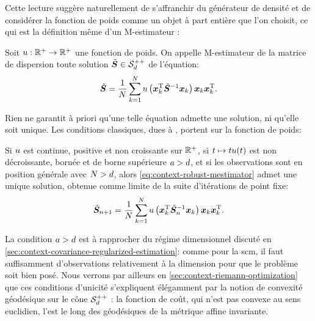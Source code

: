 Cette lecture suggère naturellement de s'affranchir du générateur de densité et de considérer la fonction de poids comme un objet à part entière que l'on choisit, ce qui est la définition même d'un M-estimateur :

\begin{definition}
\label{def:context-robust-mestimator}
  Soit $u:\mathbb{R}^+\to\mathbb{R}^+$ une fonction de poids. On appelle M-estimateur de la matrice de dispersion toute solution $\tilde{\boldsymbol{S}}\in\mathcal{S}_{d}^{++}$ de l'équation:
\begin{equation}
  \tilde{\boldsymbol{S}}
  =
  \frac{1}{N}\sum_{k=1}^{N}
  u\left(\boldsymbol{x}_k^{\mathrm{T}} {\tilde{\boldsymbol{S}}}^{-1} \boldsymbol{x}_k\right)
  \boldsymbol{x}_k\boldsymbol{x}_k^{\mathrm{T}}.
  \label{eq:context-robust-mestimator}
\end{equation}
\end{definition}

Rien ne garantit à priori qu'une telle équation admette une solution, ni qu'elle soit unique. Les conditions classiques, dues à \cite{Maronna76}, portent sur la fonction de poids:

\begin{proposition}
\label{prop:context-robust-existence}
  Si $u$ est continue, positive et non croissante sur $\mathbb{R}^+$, si $t\mapsto tu(t)$ est non décroissante, bornée et de borne supérieure $a>d$, et si les observations sont en position générale avec $N>d$, alors \cref{eq:context-robust-mestimator} admet une unique solution, obtenue comme limite de la suite d'itérations de point fixe:
\begin{equation}
  \tilde{\boldsymbol{S}}_{n+1}
  =
  \frac{1}{N}\sum_{k=1}^{N}
  u\left(\boldsymbol{x}_k^{\mathrm{T}} {\tilde{\boldsymbol{S}}_n}^{-1} \boldsymbol{x}_k\right)
  \boldsymbol{x}_k\boldsymbol{x}_k^{\mathrm{T}}.
  \label{eq:context-robust-iterations}
\end{equation}
\end{proposition}

\begin{remark}
  La condition $a>d$ est à rapprocher du régime dimensionnel discuté en \cref{sec:context-covariance-regularized-estimation}: comme pour la scm, il faut suffisamment d'observations relativement à la dimension pour que le problème soit bien posé. Nous verrons par ailleurs en \cref{sec:context-riemann-optimization} que ces conditions d'unicité s'expliquent élégamment par la notion de convexité géodésique sur le cône $\mathcal{S}_{d}^{++}$ : la fonction de coût, qui n'est pas convexe au sens euclidien, l'est le long des géodésiques de la métrique affine invariante.
\end{remark}

